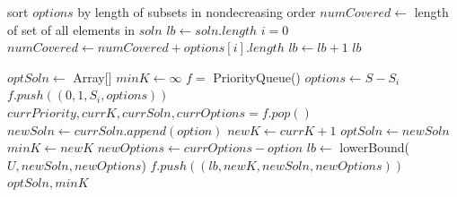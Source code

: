 \documentclass{article}
\begin{document}
\begin{algorithm}
\begin{algorithmic}[1]
	\State sort $options$ by length of subsets in nondecreasing order
	\State $numCovered \gets $ length of set of all elements in $soln$
	\State $lb \gets soln.length$
	\State $i = 0$
		\State $numCovered \gets numCovered + options[i].length$
		\State $lb \gets lb + 1$
	\EndWhile
	\State \Return $lb$
\EndFunction
\end{algorithmic}
\end{algorithm}

\begin{algorithm}
\begin{algorithmic}[1]
	\State $optSoln \gets$ Array[]
	\State $minK \gets \infty$
	\State $f = $ PriorityQueue()
		\State $options \gets S - S_i$
		\State $f.push((0, 1, S_i, options))$
	\EndFor
		\State $currPriority, currK, currSoln, currOptions = f.pop()$
			\State $newSoln \gets currSoln.append(option)$
			\State $newK \gets currK + 1$
				\State $optSoln \gets newSoln$
				\State $minK \gets newK$
			\Else
				\State $newOptions \gets currOptions - option$
				\State $lb \gets $ lowerBound($U, newSoln, newOptions$)
					\State $f.push((lb, newK, newSoln, newOptions))$
				\EndIf
			\EndIf
		\EndFor
	\EndWhile
	\State \Return $optSoln, minK$
\EndFunction
\end{algorithmic}
\end{algorithm}

\subsection{}
\end{document}
